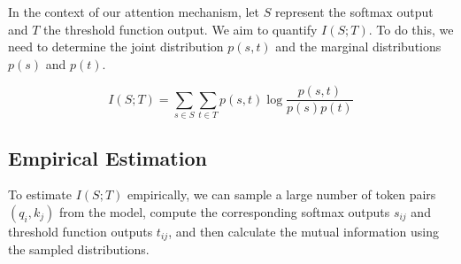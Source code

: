 \documentclass[11pt]{article}
\theoremstyle{definition}
\begin{document}
In the context of our attention mechanism, let \(S\) represent the softmax output and \(T\) the threshold function output. We aim to quantify \(I(S; T)\). To do this, we need to determine the joint distribution \(p(s, t)\) and the marginal distributions \(p(s)\) and \(p(t)\).













\begin{equation}






I(S; T) = \sum_{s \in S} \sum_{t \in T} p(s, t) \log \frac{p(s, t)}{p(s)p(t)}






\end{equation}













\subsection{Empirical Estimation}






To estimate \(I(S; T)\) empirically, we can sample a large number of token pairs \((q_i, k_j)\) from the model, compute the corresponding softmax outputs \(s_{ij}\) and threshold function outputs \(t_{ij}\), and then calculate the mutual information using the sampled distributions.
\end{document}
